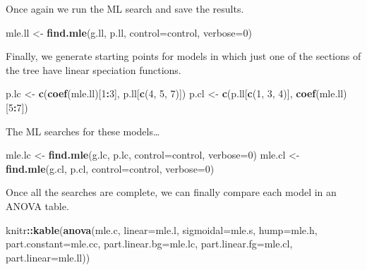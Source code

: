 \documentclass[
]{book}
\newenvironment{Shaded}{\begin{snugshade}}{\end{snugshade}}
\newcommand{\DataTypeTok}[1]{\textcolor[rgb]{0.13,0.29,0.53}{#1}}
\newcommand{\DecValTok}[1]{\textcolor[rgb]{0.00,0.00,0.81}{#1}}
\newcommand{\KeywordTok}[1]{\textcolor[rgb]{0.13,0.29,0.53}{\textbf{#1}}}
\newcommand{\NormalTok}[1]{#1}
\newcommand{\OperatorTok}[1]{\textcolor[rgb]{0.81,0.36,0.00}{\textbf{#1}}}
\newcommand{\StringTok}[1]{\textcolor[rgb]{0.31,0.60,0.02}{#1}}
\begin{document}
Once again we run the ML search and save the results.

\begin{Shaded}
\begin{Highlighting}[]
\NormalTok{mle.ll \textless{}{-}}\StringTok{ }\KeywordTok{find.mle}\NormalTok{(g.ll, p.ll, }\DataTypeTok{control=}\NormalTok{control, }\DataTypeTok{verbose=}\DecValTok{0}\NormalTok{)}
\end{Highlighting}
\end{Shaded}

Finally, we generate starting points for models in which just one of the sections of the tree have linear speciation functions.

\begin{Shaded}
\begin{Highlighting}[]
\NormalTok{p.lc \textless{}{-}}\StringTok{ }\KeywordTok{c}\NormalTok{(}\KeywordTok{coef}\NormalTok{(mle.ll)[}\DecValTok{1}\OperatorTok{:}\DecValTok{3}\NormalTok{], p.ll[}\KeywordTok{c}\NormalTok{(}\DecValTok{4}\NormalTok{, }\DecValTok{5}\NormalTok{, }\DecValTok{7}\NormalTok{)])}
\NormalTok{p.cl \textless{}{-}}\StringTok{ }\KeywordTok{c}\NormalTok{(p.ll[}\KeywordTok{c}\NormalTok{(}\DecValTok{1}\NormalTok{, }\DecValTok{3}\NormalTok{, }\DecValTok{4}\NormalTok{)], }\KeywordTok{coef}\NormalTok{(mle.ll)[}\DecValTok{5}\OperatorTok{:}\DecValTok{7}\NormalTok{])}
\end{Highlighting}
\end{Shaded}

The ML searches for these models\ldots{}

\begin{Shaded}
\begin{Highlighting}[]
\NormalTok{mle.lc \textless{}{-}}\StringTok{ }\KeywordTok{find.mle}\NormalTok{(g.lc, p.lc, }\DataTypeTok{control=}\NormalTok{control, }\DataTypeTok{verbose=}\DecValTok{0}\NormalTok{)}
\NormalTok{mle.cl \textless{}{-}}\StringTok{ }\KeywordTok{find.mle}\NormalTok{(g.cl, p.cl, }\DataTypeTok{control=}\NormalTok{control, }\DataTypeTok{verbose=}\DecValTok{0}\NormalTok{)}
\end{Highlighting}
\end{Shaded}

Once all the searches are complete, we can finally compare each model in an ANOVA table.

\begin{Shaded}
\begin{Highlighting}[]
\NormalTok{knitr}\OperatorTok{::}\KeywordTok{kable}\NormalTok{(}\KeywordTok{anova}\NormalTok{(mle.c, }\DataTypeTok{linear=}\NormalTok{mle.l, }\DataTypeTok{sigmoidal=}\NormalTok{mle.s, }\DataTypeTok{hump=}\NormalTok{mle.h, }
      \DataTypeTok{part.constant=}\NormalTok{mle.cc, }\DataTypeTok{part.linear.bg=}\NormalTok{mle.lc, }
      \DataTypeTok{part.linear.fg=}\NormalTok{mle.cl, }\DataTypeTok{part.linear=}\NormalTok{mle.ll))}
\end{Highlighting}
\end{Shaded}
\end{document}
